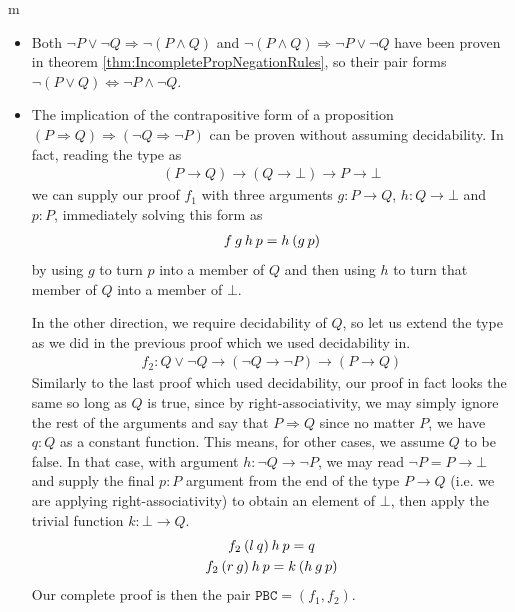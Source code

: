 \documentclass[11pt]{article}
\begin{document}
\begin{my proof}{m}
\begin{itemize}
\item Both $\neg P \vee \neg Q \Rightarrow \neg (P \wedge Q)$ and $\neg (P \wedge Q) \Rightarrow \neg P \vee \neg Q$ have been proven in theorem \ref{thm:IncompletePropNegationRules}, so their pair forms $\neg (P \vee Q) \Leftrightarrow \neg P \wedge \neg Q$.

\item The implication of the contrapositive form of a proposition $(P \Rightarrow Q) \Rightarrow (\neg Q \Rightarrow \neg P)$ can be proven without assuming decidability. In fact, reading the type as \begin{gather*}
(P \to Q) \to (Q \to \bot) \to P \to \bot
\end{gather*}
we can supply our proof $f_1$ with three arguments $g \colon P \to Q$, $h \colon Q \to \bot$ and $p \colon P$, immediately solving this form as \begin{gather*}
f \hspace{0.2em} g \hspace{0.2em} h \hspace{0.2em} p = h \hspace{0.2em} (g \hspace{0.2em} p)
\end{gather*}
by using $g$ to turn $p$ into a member of $Q$ and then using $h$ to turn that member of $Q$ into a member of $\bot$.

In the other direction, we require decidability of $Q$, so let us extend the type as we did in the previous proof which we used decidability in. \begin{align*}
f_2 \colon Q \vee \neg Q \to (\neg Q \to \neg P ) \to (P \to Q)
\end{align*}
Similarly to the last proof which used decidability, our proof in fact looks the same so long as $Q$ is true, since by right-associativity, we may simply ignore the rest of the arguments and say that $P \Rightarrow Q$ since no matter $P$, we have $q \colon Q$ as a constant function. This means, for other cases, we assume $Q$ to be false. In that case, with argument $h \colon \neg Q \to \neg P$, we may read $\neg P = P \to \bot$ and supply the final $p \colon P$ argument from the end of the type $P \to Q$ (i.e. we are applying right-associativity) to obtain an element of $\bot$, then apply the trivial function $k \colon \bot \to Q$.
\begin{gather*}
f_2 \hspace{0.2em} (l \hspace{0.2em} q) \hspace{0.2em} h \hspace{0.2em} p = q \\
f_2 \hspace{0.2em} (r \hspace{0.2em} g) \hspace{0.2em} h \hspace{0.2em} p = k \hspace{0.2em} (h \hspace{0.2em} g \hspace{0.2em} p)
\end{gather*}
Our complete proof is then the pair $\mathtt{PBC} = (f_1,f_2)$.


\end{itemize}
\end{my proof}
\end{document}
